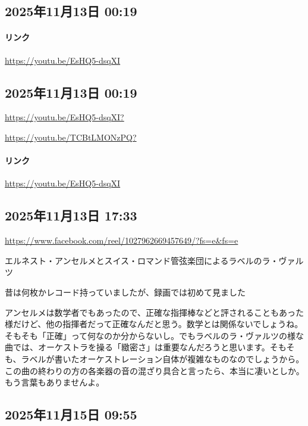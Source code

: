 \subsection*{2025年11月13日 00:19}

\paragraph{リンク}
\url{https://youtu.be/EsHQ5-dsqXI}

\subsection*{2025年11月13日 00:19}

\url{https://youtu.be/EsHQ5-dsqXI?}

\url{https://youtu.be/TCBtLMONzPQ?}

\paragraph{リンク}
\url{https://youtu.be/EsHQ5-dsqXI}

\subsection*{2025年11月13日 17:33}

\url{https://www.facebook.com/reel/1027962669457649/?fs=e&fs=e}

エルネスト・アンセルメとスイス・ロマンド管弦楽団によるラベルのラ・ヴァルツ

昔は何枚かレコード持っていましたが、録画では初めて見ました

アンセルメは数学者でもあったので、正確な指揮棒などと評されることもあった様だけど、他の指揮者だって正確なんだと思う。数学とは関係ないでしょうね。そもそも「正確」って何なのか分からないし。でもラベルのラ・ヴァルツの様な曲では、オーケストラを操る「緻密さ」は重要なんだろうと思います。そもそも、ラベルが書いたオーケストレーション自体が複雑なものなのでしょうから。この曲の終わりの方の各楽器の音の混ざり具合と言ったら、本当に凄いとしか。もう言葉もありませんよ。

\subsection*{2025年11月15日 09:55}

